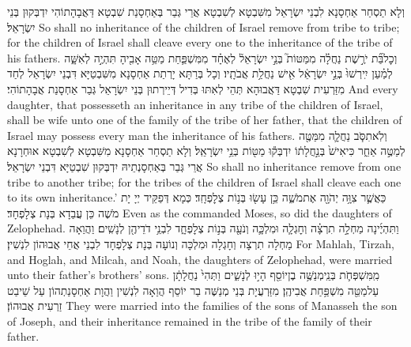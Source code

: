 {וְלָא תַסְחַר אַחְסָנָא לִבְנֵי יִשְׂרָאֵל מִשִּׁבְטָא לְשִׁבְטָא אֲרֵי גְּבַר בְּאַחְסָנַת שִׁבְטָא דַּאֲבָהָתוֹהִי יִדְבְּקוּן בְּנֵי יִשְׂרָאֵל׃}
{So shall no inheritance of the children of Israel remove from tribe to tribe; for the children of Israel shall cleave every one to the inheritance of the tribe of his fathers.}{}
{וְכׇל\maqqaf בַּ֞ת יֹרֶ֣שֶׁת נַחֲלָ֗ה מִמַּטּוֹת֮ בְּנֵ֣י יִשְׂרָאֵל֒ לְאֶחָ֗ד מִמִּשְׁפַּ֛חַת מַטֵּ֥ה אָבִ֖יהָ תִּהְיֶ֣ה לְאִשָּׁ֑ה לְמַ֗עַן יִֽירְשׁוּ֙ בְּנֵ֣י יִשְׂרָאֵ֔ל אִ֖ישׁ נַחֲלַ֥ת אֲבֹתָֽיו׃}
{וְכָל בְּרַתָּא יָרְתַת אַחְסָנָא מִשִּׁבְטַיָּא דִּבְנֵי יִשְׂרָאֵל לְחַד מִזַּרְעִית שִׁבְטָא דַּאֲבוּהָא תְּהֵי לְאִתּוּ בְּדִיל דְּיֵירְתוּן בְּנֵי יִשְׂרָאֵל גְּבַר אַחְסָנַת אֲבָהָתוֹהִי׃}
{And every daughter, that possesseth an inheritance in any tribe of the children of Israel, shall be wife unto one of the family of the tribe of her father, that the children of Israel may possess every man the inheritance of his fathers.}{}
{וְלֹֽא\maqqaf תִסֹּ֧ב נַחֲלָ֛ה מִמַּטֶּ֖ה לְמַטֶּ֣ה אַחֵ֑ר כִּי\maqqaf אִישׁ֙ בְּנַ֣חֲלָת֔וֹ יִדְבְּק֕וּ מַטּ֖וֹת בְּנֵ֥י יִשְׂרָאֵֽל׃}
{וְלָא תַסְחַר אַחְסָנָא מִשִּׁבְטָא לְשִׁבְטָא אוּחְרָנָא אֲרֵי גְּבַר בְּאַחְסָנְתֵיהּ יִדְבְּקוּן שִׁבְטַיָּא דִּבְנֵי יִשְׂרָאֵל׃}
{So shall no inheritance remove from one tribe to another tribe; for the tribes of the children of Israel shall cleave each one to its own inheritance.’}{}
{כַּאֲשֶׁ֛ר צִוָּ֥ה יְהֹוָ֖ה אֶת\maqqaf מֹשֶׁ֑ה כֵּ֥ן עָשׂ֖וּ בְּנ֥וֹת צְלׇפְחָֽד׃}
{כְּמָא דְּפַקֵּיד יְיָ יָת מֹשֶׁה כֵּן עֲבַדָא בְּנָת צְלָפְחָד׃}
{Even as the \lord\space commanded Moses, so did the daughters of Zelophehad.}{}
{וַתִּהְיֶ֜ינָה מַחְלָ֣ה תִרְצָ֗ה וְחׇגְלָ֧ה וּמִלְכָּ֛ה וְנֹעָ֖ה בְּנ֣וֹת צְלׇפְחָ֑ד לִבְנֵ֥י דֹדֵיהֶ֖ן לְנָשִֽׁים׃}
{וַהֲוַאָה מַחְלָה תִרְצָה וְחָגְלָה וּמִלְכָּה וְנוֹעָה בְּנָת צְלָפְחָד לִבְנֵי אֲחֵי אֲבוּהוֹן לִנְשִׁין׃}
{For Mahlah, Tirzah, and Hoglah, and Milcah, and Noah, the daughters of Zelophehad, were married unto their father’s brothers’ sons.}{}
{מִֽמִּשְׁפְּחֹ֛ת בְּנֵֽי\maqqaf מְנַשֶּׁ֥ה בֶן\maqqaf יוֹסֵ֖ף הָי֣וּ לְנָשִׁ֑ים וַתְּהִי֙ נַחֲלָתָ֔ן עַל\maqqaf מַטֵּ֖ה מִשְׁפַּ֥חַת אֲבִיהֶֽן׃}
{מִזַּרְעֲיָת בְּנֵי מְנַשֶּׁה בַר יוֹסֵף הֲוַאָה לִנְשִׁין וַהֲוָת אַחְסָנַתְהוֹן עַל שֵׁיבַט זַרְעִית אֲבוּהוֹן׃}
{They were married into the families of the sons of Manasseh the son of Joseph, and their inheritance remained in the tribe of the family of their father.}{}

